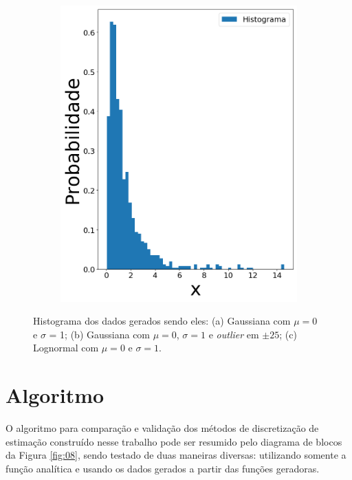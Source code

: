 \begin{figure}[H]
\begin{subfigure}[b]{0.27\textwidth}
		\includegraphics[width=\linewidth]{./figuras/datalognormal_0}
		\caption{}
		\label{fig:randlog}
	\end{subfigure}
	
	\caption{Histograma dos dados gerados sendo eles: (a) Gaussiana com $\mu = 0$ e $\sigma$ = 1; (b) Gaussiana com $\mu = 0$, $\sigma = 1$ e \textit{outlier} em $\pm 25$; (c) Lognormal com $\mu = 0$ e $\sigma = 1$.}
	\label{fig:data}
\end{figure}





\section{Algoritmo}

O algoritmo para comparação e validação dos métodos de discretização de estimação construído nesse trabalho pode ser resumido pelo diagrama de blocos da Figura \ref{fig:08}, sendo testado de duas maneiras diversas: utilizando somente a função analítica e usando os dados gerados a partir das funções geradoras.

